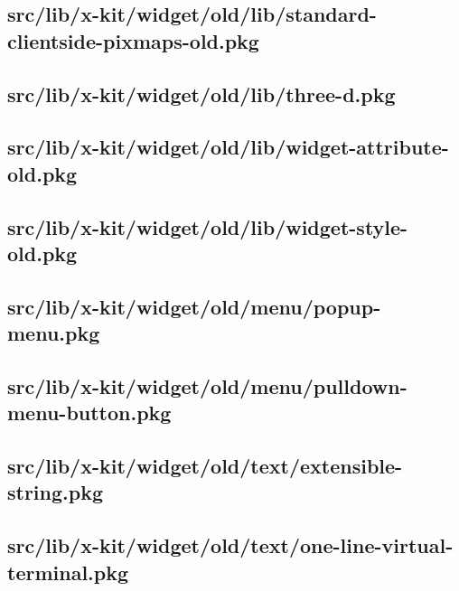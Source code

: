 \subsection{src/lib/x-kit/widget/old/lib/standard-clientside-pixmaps-old.pkg}


\subsection{src/lib/x-kit/widget/old/lib/three-d.pkg}


\subsection{src/lib/x-kit/widget/old/lib/widget-attribute-old.pkg}


\subsection{src/lib/x-kit/widget/old/lib/widget-style-old.pkg}


\subsection{src/lib/x-kit/widget/old/menu/popup-menu.pkg}


\subsection{src/lib/x-kit/widget/old/menu/pulldown-menu-button.pkg}


\subsection{src/lib/x-kit/widget/old/text/extensible-string.pkg}


\subsection{src/lib/x-kit/widget/old/text/one-line-virtual-terminal.pkg}


